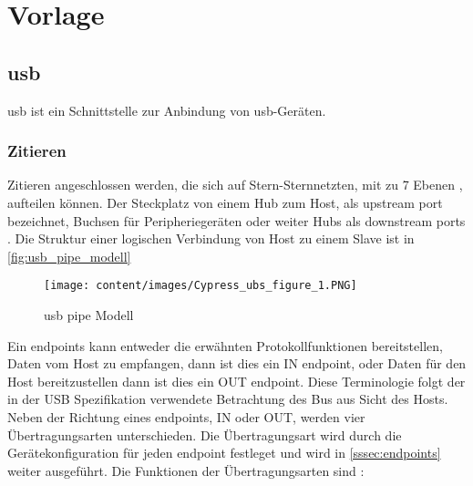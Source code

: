 \section{Vorlage}
\subsection[USB]{\acrshort{usb}}
\acrfull{usb} ist ein Schnittstelle zur Anbindung von \acrshort{usb}-Geräten.


\subsubsection{Zitieren} \label{sssec:zitieren}

Zitieren \cite[s. 31]{usb_developer_guide} angeschlossen werden, die sich auf Stern-Sternnetzten, mit zu 7 Ebenen \cite[4.1.1]{usb_developer_guide}, aufteilen können. Der Steckplatz von einem Hub zum Host, als upstream port bezeichnet, Buchsen für Peripheriegeräten oder weiter Hubs als downstream ports \cite{AboutBlitzerDe}.
Die Struktur einer logischen Verbindung von Host zu einem Slave ist in \autoref{fig:usb_pipe_modell} 
\begin{figure}[h]
    \centering
    \texttt{[image: content/images/Cypress\_ubs\_figure\_1.PNG]}
    \caption{\acrshort{usb} pipe Modell \cite[Figure~1]{usb_developer_guide}}
    \label{fig:usb_pipe_modell}
\end{figure}
\par
Ein endpoints kann entweder die erwähnten Protokollfunktionen bereitstellen, Daten vom Host zu empfangen, dann ist dies ein IN endpoint, oder Daten für den Host bereitzustellen dann ist dies ein OUT endpoint. Diese Terminologie folgt der in der USB Spezifikation verwendete Betrachtung des Bus aus Sicht des Hosts.
Neben der Richtung eines endpoints, IN oder OUT, werden vier Übertragungsarten \cite[5.4]{usb_developer_guide} unterschieden. Die Übertragungsart wird durch die Gerätekonfiguration für jeden endpoint festleget und wird in \autoref{sssec:endpoints} weiter ausgeführt. Die Funktionen der Übertragungsarten sind \cite[4.7]{usb_developer_guide}:

